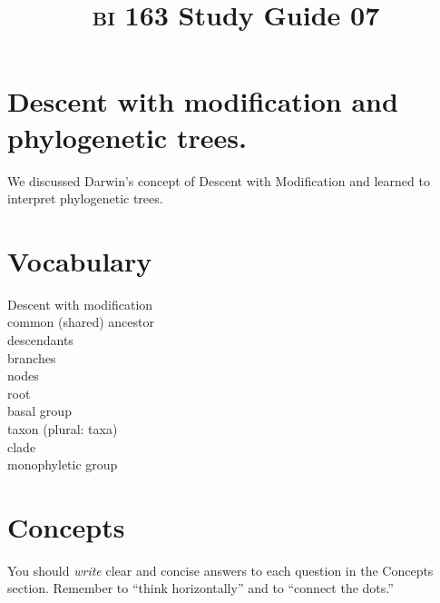 \documentclass[letterpaper]{tufte-handout}
\title{{\scshape bi} 163 Study Guide 07}
\date{} %
\begin{document}
\maketitle	%

\section*{Descent with modification and phylogenetic trees.}

We discussed Darwin's concept of Descent with Modification and learned to interpret phylogenetic trees.

\section*{Vocabulary}

\vspace{-1\baselineskip}
\begin{multicols}{2}
Descent with modification\\
common (shared) ancestor \\
descendants \\
branches \\
nodes \\
root \\
basal group \\
taxon (plural: taxa) \\
clade \\
monophyletic group \\

\end{multicols}

\section*{Concepts}

You should \emph{write} clear and concise answers to each question in the Concepts section.  Remember to ``think horizontally'' and to ``connect the dots.'' 
\end{document}
